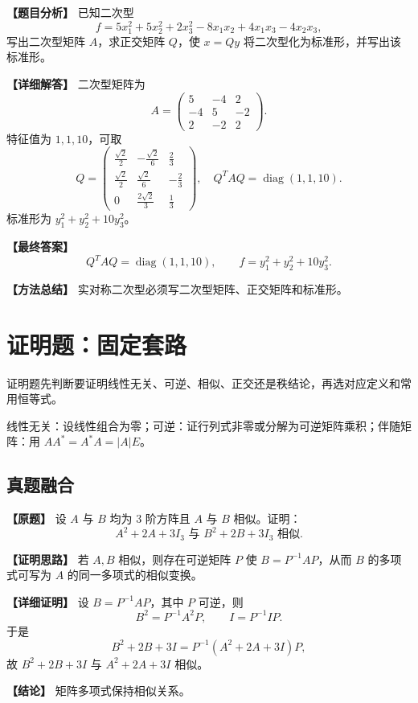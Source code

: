 \documentclass[11pt,a4paper,UTF8]{ctexart}
\newcommand{\diag}{\operatorname{diag}}
\begin{document}
\begin{answerbox}
\textbf{【题目分析】} 已知二次型
\[
f=5x_1^2+5x_2^2+2x_3^2-8x_1x_2+4x_1x_3-4x_2x_3,
\]
写出二次型矩阵 $A$，求正交矩阵 $Q$，使 $x=Qy$ 将二次型化为标准形，并写出该标准形。

\textbf{【详细解答】} 二次型矩阵为
\[
A=\begin{pmatrix}5&-4&2\\-4&5&-2\\2&-2&2\end{pmatrix}.
\]
特征值为 $1,1,10$，可取
\[
Q=\begin{pmatrix}
\frac{\sqrt2}{2}&-\frac{\sqrt2}{6}&\frac23\\
\frac{\sqrt2}{2}&\frac{\sqrt2}{6}&-\frac23\\
0&\frac{2\sqrt2}{3}&\frac13
\end{pmatrix},
\quad Q^TAQ=\diag(1,1,10).
\]
标准形为 $y_1^2+y_2^2+10y_3^2$。

\textbf{【最终答案】}
\[
Q^TAQ=\diag(1,1,10),\qquad f=y_1^2+y_2^2+10y_3^2.
\]

\textbf{【方法总结】} 实对称二次型必须写二次型矩阵、正交矩阵和标准形。
\end{answerbox}


\section{证明题：固定套路}

\begin{identifybox}[识别]
证明题先判断要证明线性无关、可逆、相似、正交还是秩结论，再选对应定义和常用恒等式。
\end{identifybox}
\begin{templatebox}[考场模板]
线性无关：设线性组合为零；可逆：证行列式非零或分解为可逆矩阵乘积；伴随矩阵：用 $AA^*=A^*A=|A|E$。
\end{templatebox}

\subsection{真题融合}

\begin{answerbox}
\textbf{【原题】} 设 $A$ 与 $B$ 均为 $3$ 阶方阵且 $A$ 与 $B$ 相似。证明：
\[
A^2+2A+3I_3\text{ 与 }B^2+2B+3I_3\text{ 相似}.
\]

\textbf{【证明思路】} 若 $A,B$ 相似，则存在可逆矩阵 $P$ 使 $B=P^{-1}AP$，从而 $B$ 的多项式可写为 $A$ 的同一多项式的相似变换。

\textbf{【详细证明】} 设 $B=P^{-1}AP$，其中 $P$ 可逆，则
\[
B^2=P^{-1}A^2P,\qquad I=P^{-1}IP.
\]
于是
\[
B^2+2B+3I=P^{-1}(A^2+2A+3I)P,
\]
故 $B^2+2B+3I$ 与 $A^2+2A+3I$ 相似。

\textbf{【结论】} 矩阵多项式保持相似关系。
\end{answerbox}
\end{document}
